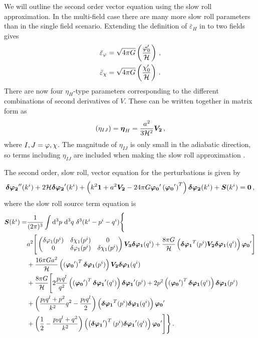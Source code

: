 We will outline the second order vector equation using the slow roll approximation.
In the multi-field case there are many more slow roll parameters than in the
single field scenario. Extending the definition of $\bar{\varepsilon}_H$ in
 to two fields gives
% 
\begin{align}
 \bar{\varepsilon}_{\varphi} &= \sqrt{4\pi G} \left( \frac{\varphi_0'}{\mathcal{H}} \right) \,,\\
 \bar{\varepsilon}_\chi &= \sqrt{4\pi G} \left( \frac{\chi_0'}{\mathcal{H}} \right)\,.
\end{align}
% 
There are now four $\eta_H$-type parameters corresponding to the different
combinations of second derivatives of $V$. These can be written together in matrix form
as
% 
\begin{equation}
 (\eta_{IJ}) = \boldsymbol{\eta}_H = \frac{a^2}{3\mathcal{H}^2} \boldsymbol{V_2} \,,
\end{equation}
% 
where $I,J = \varphi,\chi$.
The magnitude of $\eta_{IJ}$ is only small in the adiabatic direction, so terms
including $\eta_{IJ}$ are included when making the slow roll approximation
\cite{Malik:2006ir}.

The second order, slow roll, vector equation for the perturbations is given by 
% 
\begin{align}
 \boldsymbol{\delta\varphi_{2}}''(k^i) + 2\mathcal{H}\boldsymbol{\delta\varphi_{2}}'(k^i) 
 + \left( k^2\boldsymbol{1} + a^2\boldsymbol{V_2} - 24\pi G \boldsymbol{\varphi_0}' \left(\boldsymbol{\varphi_0}'\right)^T \right)
       \boldsymbol{\delta\varphi_{2}}(k^i)
 + \boldsymbol{S}(k^i) = \boldsymbol{0}\,,
\end{align}
% 
where the slow roll source term equation is
% 
\begin{align}
\label{eq:src-vector-res}
\bm{S}(\kvi) =  
&\frac{1}{(2\pi)^3}\int \d^3p\ \d^3q\ \delta^3(\kvi-\pvi-\qvi) \Bigg\{ \\
% 
&a^2 \Bigg[ 
\begin{pmatrix}
\dvp1(\pvi) & \delta \chi_1(\pvi) & 0  \nonumber\\
0           & \dvp1(\pvi)         & \delta \chi_1(\pvi) 
\end{pmatrix}
\bm{V_3}\bm{\dvp1}(\qvi) 
% 
+ \frac{8\pi G}{\H}\left( 
    \bm{\dvp1}^T(\pvi) \bm{V_2} \bm{\dvp1}(\qvi)
\right) \bm{\vp_0}' \Bigg] \nonumber\\
% 
&+ \frac{16\pi G a^2}{\H}\left(\left(\bm{\vp_0}'\right)^T \bm{\dvp1}(\pvi) \right)
    \bm{V_2} \bm{\dvp1}(\qvi) \nonumber \\
% 
&+ \frac{8\pi G}{\H} \Bigg[ 2\frac{p_l q^l}{q^2} 
      \left( \left(\bm{\vp_0}'\right)^T \bm{\dvp1}'(\qvi) \right) \bm{\dvp1}'(\pvi)
 + 2p^2 \left( \left(\bm{\vp_0}'\right)^T \bm{\dvp1}(\qvi) \right) \bm{\dvp1}(\pvi) \nonumber \\
% 
&+\left( \frac{p_l q^l + p^2}{k^2}q^2 - \frac{p_l q^l}{2} \right) 
      \left( \bm{\dvp1}^T(\pvi) \bm{\dvp1}(\qvi) \right) \bm{\vp_0}' \nonumber \\
% 
&+\left(\frac{1}{2} -\frac{p_l q^l + q^2}{k^2}\right) 
      \left( \left(\bm{\dvp1}'\right)^T(\pvi) \bm{\dvp1}'(\qvi) \right) \bm{\vp_0}' \Bigg] \Bigg\}
\,.
\end{align}

